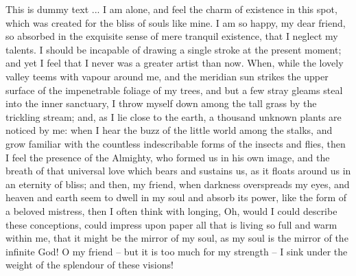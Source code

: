 \documentclass[letterpaper,oneside,11pt]{book}
\begin{document}
This is dummy text ... I am alone, and feel the charm of existence in this spot, which was created for the bliss of souls like mine. I am so happy, my dear friend, so absorbed in the exquisite sense of mere tranquil existence, that I neglect my talents. I should be incapable of drawing a single stroke at the present moment; and yet I feel that I never was a greater artist than now. When, while the lovely valley teems with vapour around me, and the meridian sun strikes the upper surface of the impenetrable foliage of my trees, and but a few stray gleams steal into the inner sanctuary, I throw myself down among the tall grass by the trickling stream; and, as I lie close to the earth, a thousand unknown plants are noticed by me: when I hear the buzz of the little world among the stalks, and grow familiar with the countless indescribable forms of the insects and flies, then I feel the presence of the Almighty, who formed us in his own image, and the breath of that universal love which bears and sustains us, as it floats around us in an eternity of bliss; and then, my friend, when darkness overspreads my eyes, and heaven and earth seem to dwell in my soul and absorb its power, like the form of a beloved mistress, then I often think with longing, Oh, would I could describe these conceptions, could impress upon paper all that is living so full and warm within me, that it might be the mirror of my soul, as my soul is the mirror of the infinite God! O my friend -- but it is too much for my strength -- I sink under the weight of the splendour of these visions!
\end{document}
